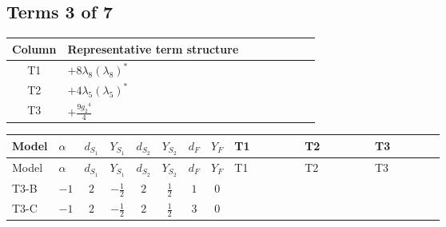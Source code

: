 \documentclass[8pt]{article}
\begin{document}
\begin{landscape}
\subsection*{Terms 3 of 7}
\begin{center}
\begin{tabular}{@{}c >{\raggedright\arraybackslash}p{0.82\linewidth}@{}}
\toprule
Column & Representative term structure \\
\midrule
T1 & \(\displaystyle +8 {\lambda_{8}} \left({\lambda_{8}}\right)^{*}\) \\
\midrule
T2 & \(\displaystyle +4 {\lambda_5} \left({\lambda_5}\right)^{*}\) \\
\midrule
T3 & \(\displaystyle +\frac{9 {g_2}^4}{4}\) \\
\midrule
\bottomrule
\end{tabular}
\end{center}
\smallskip
\tiny
\begin{longtable}{@{}llcccccc >{\raggedright\arraybackslash}p{0.21\linewidth} >{\raggedright\arraybackslash}p{0.21\linewidth} >{\raggedright\arraybackslash}p{0.21\linewidth}@{}}
\toprule
Model & $\alpha$ & $d_{S_1}$ & $Y_{S_1}$ & $d_{S_2}$ & $Y_{S_2}$ & $d_F$ & $Y_F$ & T1 & T2 & T3 \\
\midrule
\endfirsthead
\toprule
Model & $\alpha$ & $d_{S_1}$ & $Y_{S_1}$ & $d_{S_2}$ & $Y_{S_2}$ & $d_F$ & $Y_F$ & T1 & T2 & T3 \\
\midrule
\endhead
T3-B & $-1$ & $2$ & $-\frac{1}{2}$ & $2$ & $\frac{1}{2}$ & $1$ & $0$ & \scriptsize\adjustbox{max width=\linewidth}{$\begin{gathered} +8 {\lambda_{8}} \left({\lambda_{8}}\right)^{*}\end{gathered}$} & \scriptsize\adjustbox{max width=\linewidth}{$\begin{gathered} +4 {\lambda_5} \left({\lambda_5}\right)^{*}\end{gathered}$} & \scriptsize\adjustbox{max width=\linewidth}{$\begin{gathered} +\frac{9 {g_2}^4}{4}\end{gathered}$} \\
\midrule
T3-C & $-1$ & $2$ & $-\frac{1}{2}$ & $2$ & $\frac{1}{2}$ & $3$ & $0$ & \scriptsize\adjustbox{max width=\linewidth}{$\begin{gathered} +8 {\lambda_{8}} \left({\lambda_{8}}\right)^{*}\end{gathered}$} & \scriptsize\adjustbox{max width=\linewidth}{$\begin{gathered} +4 {\lambda_5} \left({\lambda_5}\right)^{*}\end{gathered}$} & \scriptsize\adjustbox{max width=\linewidth}{$\begin{gathered} +\frac{9 {g_2}^4}{4}\end{gathered}$} \\

\end{longtable}
\end{landscape}
\end{document}
